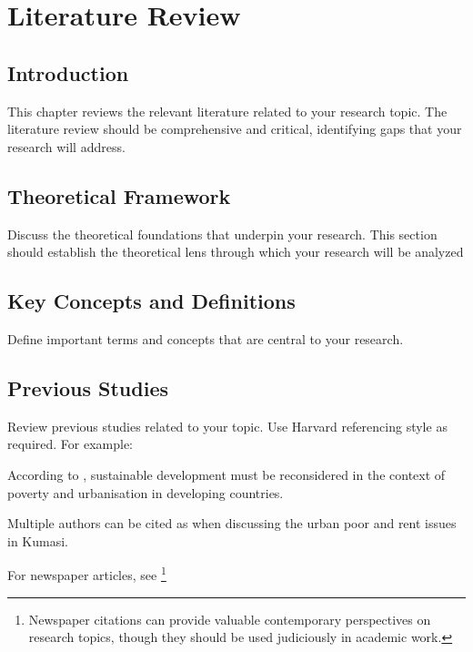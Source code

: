 
\chapter{Literature Review}

\section{Introduction}

This chapter reviews the relevant literature related to your research topic. The literature review should be comprehensive and critical, identifying gaps that your research will address.

\section{Theoretical Framework}

Discuss the theoretical foundations that underpin your research. This section should establish the theoretical lens through which your research will be analyzed

\section{Key Concepts and Definitions}

Define important terms and concepts that are central to your research.

\section{Previous Studies}

Review previous studies related to your topic. Use Harvard referencing style as required. For example:

According to \citet{Cobbinah2015a}, sustainable development must be reconsidered in the context of poverty and urbanisation in developing countries.

Multiple authors can be cited as \citep{Duah2015, PokuBoansi2015} when discussing the urban poor and rent issues in Kumasi.

For newspaper articles, see \cite{Tamakloe2008}\footnote{Newspaper citations can provide valuable contemporary perspectives on research topics, though they should be used judiciously in academic work.}

